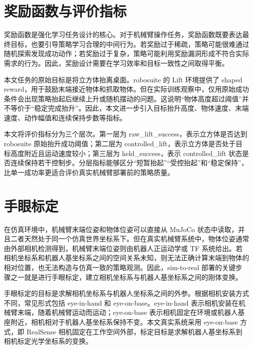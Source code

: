 \documentclass[
    type = bachelor,
    oneside,
    fontset = fandol
]{njuthesis}
\begin{document}
\section{奖励函数与评价指标}

奖励函数是强化学习任务设计的核心。对于机械臂操作任务，奖励函数既要表达最终目标，也要引导策略学习合理的中间行为。若奖励过于稀疏，策略可能很难通过随机探索发现成功动作；若奖励过于复杂，策略可能利用奖励漏洞形成不符合实际需求的行为。因此，奖励设计需要在学习效率和目标一致性之间取得平衡。

本文任务的原始目标是将立方体抬离桌面。robosuite 的 Lift 环境提供了 shaped reward，用于鼓励末端接近物体和抓取物体。但在实际训练观察中，仅用原始成功条件会出现策略抬起后继续上升或随机摆动的问题。这说明“物体高度超过阈值”并不等价于“稳定完成抬升”。因此，本文进一步引入目标抬升高度、物体速度、末端速度、动作幅值和连续保持步数等指标。

本文将评价指标分为三个层次。第一层为 raw\_lift\_success，表示立方体是否达到 robosuite 原始抬升成功阈值；第二层为 controlled\_lift，表示立方体是否处于目标高度附近且运动速度较小；第三层为 held\_success，表示 controlled\_lift 状态是否连续保持若干控制步。分层指标能够区分“短暂抬起”“受控抬起”和“稳定保持”，比单一成功率更适合评价真实机械臂部署前的策略质量。

\section{手眼标定}

在仿真环境中，机械臂末端位姿和物体位姿可以直接从 MuJoCo 状态中读取，并且二者天然处于同一个仿真世界坐标系下。但在真实机械臂系统中，物体位姿通常由外部相机检测得到，机械臂末端位姿则由机器人正运动学或 TF 系统给出。若相机坐标系和机器人基坐标系之间的空间关系未知，则无法正确计算末端到物体的相对位置，也无法构造与仿真一致的策略观测。因此，sim-to-real 部署的关键步骤之一就是进行手眼标定，建立相机坐标系与机器人基坐标系之间的刚体变换。

手眼标定的目标是求解相机坐标系与机器人坐标系之间的外参。根据相机安装方式不同，常见形式包括 eye-in-hand 和 eye-on-base。eye-in-hand 表示相机安装在机械臂末端，随着机械臂运动而运动；eye-on-base 表示相机固定在环境或机器人基座附近，相机相对于机器人基坐标系保持不变。本文真实系统采用 eye-on-base 方式，即 RealSense 相机固定在工作空间外部，标定目标是求解机器人基坐标系到相机标定光学坐标系的变换。
\end{document}
